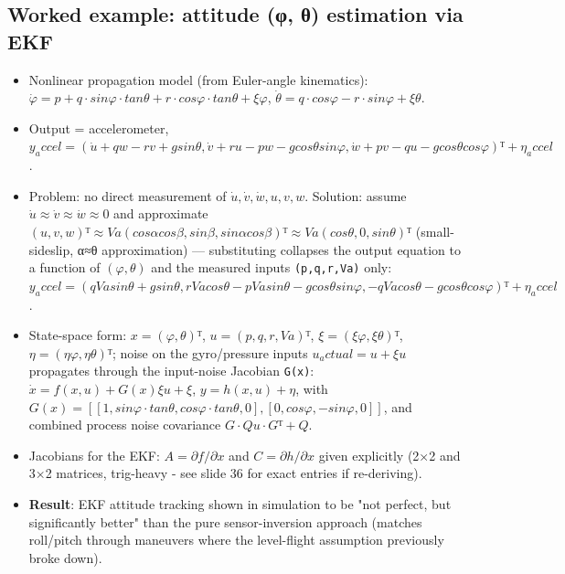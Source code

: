 \documentclass[11pt]{article}
\begin{document}
\subsection{Worked example: attitude (φ, θ) estimation via EKF}
\begin{itemize}
\item Nonlinear propagation model (from Euler-angle kinematics): $\dot{φ} = p + q·sinφ·tanθ + r·cosφ·tanθ + ξφ$, $\dot{θ} = q·cosφ - r·sinφ + ξθ$.
\item Output = accelerometer, $y_accel = (\dot{u}+qw-rv+g sinθ, \dot{v}+ru-pw-g cosθ sinφ, \dot{w}+pv-qu-g cosθ cosφ)ᵀ + η_accel$.
\item Problem: no direct measurement of $\dot{u},\dot{v},\dot{w},u,v,w$. Solution: assume $\dot{u}≈\dot{v}≈\dot{w}≈0$ and approximate $(u,v,w)ᵀ ≈ Va(cosα cosβ, sinβ, sinα cosβ)ᵀ ≈ Va(cosθ, 0, sinθ)ᵀ$ (small-sideslip, α≈θ approximation) — substituting collapses the output equation to a function of $(φ,θ)$ and the measured inputs \texttt{(p,q,r,Va)} only:
$y_accel = (qVa sinθ + g sinθ, rVa cosθ - pVa sinθ - g cosθ sinφ, -qVa cosθ - g cosθ cosφ)ᵀ + η_accel$.
\item State-space form: $x=(φ,θ)ᵀ$, $u=(p,q,r,Va)ᵀ$, $ξ=(ξφ,ξθ)ᵀ$, $η=(ηφ,ηθ)ᵀ$; noise on the gyro/pressure inputs $u_actual=u+ξu$ propagates through the input-noise Jacobian \texttt{G(x)}:
$\dot{x}=f(x,u)+G(x)ξu+ξ$, $y=h(x,u)+η$, with $G(x) = [[1, sinφ·tanθ, cosφ·tanθ, 0],[0, cosφ, -sinφ, 0]]$, and combined process noise covariance $G·Qu·Gᵀ + Q$.
\item Jacobians for the EKF: $A=∂f/∂x$ and $C=∂h/∂x$ given explicitly (2×2 and 3×2 matrices, trig-heavy - see slide 36 for exact entries if re-deriving).
\item \textbf{Result}: EKF attitude tracking shown in simulation to be "not perfect, but significantly better" than the pure sensor-inversion approach (matches roll/pitch through maneuvers where the level-flight assumption previously broke down).
\end{itemize}
\end{document}
